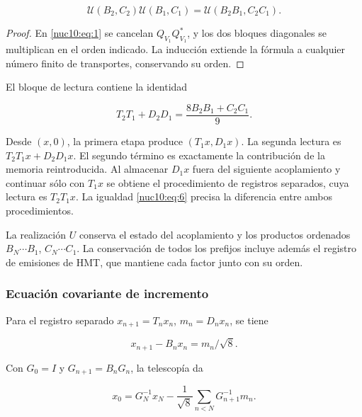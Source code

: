 \begin{equation}
\boxed{\mathcal U(B_2,C_2)\mathcal U(B_1,C_1)
=\mathcal U(B_2B_1,C_2C_1).}
\label{nuc10:eq:5}
\end{equation}



\begin{proof}
En \eqref{nuc10:eq:1} se cancelan \(Q_{V_1}Q_{V_1}^*\), y los dos bloques diagonales se multiplican en el orden indicado. La inducción extiende la fórmula a cualquier número finito de transportes, conservando su orden.
\end{proof}

El bloque de lectura contiene la identidad



\begin{equation}
\boxed{T_2T_1+D_2D_1=\frac{8B_2B_1+C_2C_1}{9}.}
\label{nuc10:eq:6}
\end{equation}



Desde \((x,0)\), la primera etapa produce \((T_1x,D_1x)\). La segunda lectura es \(T_2T_1x+D_2D_1x\). El segundo término es exactamente la contribución de la memoria reintroducida. Al almacenar \(D_1x\) fuera del siguiente acoplamiento y continuar sólo con \(T_1x\) se obtiene el procedimiento de registros separados, cuya lectura es \(T_2T_1x\). La igualdad \eqref{nuc10:eq:6} precisa la diferencia entre ambos procedimientos.

La realización \(U\) conserva el estado del acoplamiento y los productos ordenados \(B_N\cdots B_1\), \(C_N\cdots C_1\). La conservación de todos los prefijos incluye además el registro de emisiones de HMT, que mantiene cada factor junto con su orden.

\subsubsection{Ecuación covariante de incremento}

Para el registro separado \(x_{n+1}=T_nx_n\), \(m_n=D_nx_n\), se tiene



\begin{equation}
x_{n+1}-B_nx_n=m_n/\sqrt8.
\label{nuc10:eq:7}
\end{equation}



Con \(G_0=I\) y \(G_{n+1}=B_nG_n\), la telescopía da



\begin{equation}
x_0=G_N^{-1}x_N-\frac1{\sqrt8}\sum_{n<N}G_{n+1}^{-1}m_n.
\label{nuc10:eq:8}
\end{equation}



